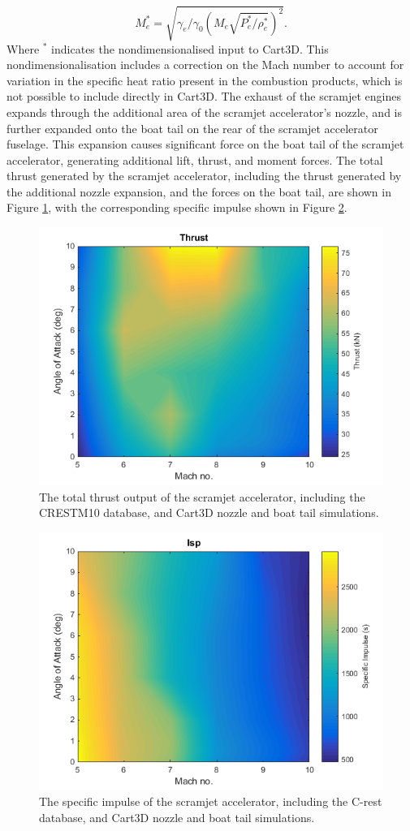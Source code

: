 \begin{equation}
M_e^* = \sqrt{\gamma_e/\gamma_0 (M_e \sqrt{ P_e^*/\rho_e^*})^2}.
\end{equation}
Where $^*$ indicates the nondimensionalised input to Cart3D. This nondimensionalisation includes a correction on the Mach number to account for variation in the specific heat ratio present in the combustion products, which is not possible to include directly in Cart3D\cite{Mehta2016}. The exhaust of the scramjet engines expands through the additional area of the scramjet accelerator's nozzle, and is further expanded onto the boat tail on the rear of the scramjet accelerator fuselage. This expansion causes significant force on the boat tail of the scramjet accelerator, generating additional lift, thrust, and moment forces. The total thrust generated by the scramjet accelerator, including the thrust generated by the additional nozzle expansion, and the forces on the boat tail, are shown in Figure \ref{fig:Thrust}, with the corresponding specific impulse shown in Figure \ref{fig:Isp}.



\begin{figure}[ht]
	\centering
	\includegraphics[width=0.6\linewidth]{figures/3_vehicle_design/Thrust}
	\caption{The total thrust output of the scramjet accelerator, including the CRESTM10 database, and Cart3D nozzle and boat tail simulations.}
	\label{fig:Thrust}
\end{figure}

\begin{figure}[ht]
	\centering
	\includegraphics[width=0.6\linewidth]{figures/3_vehicle_design/Isp}
	\caption{The specific impulse of the scramjet accelerator, including the C-rest database, and Cart3D nozzle and boat tail simulations.}
	\label{fig:Isp}
\end{figure}


